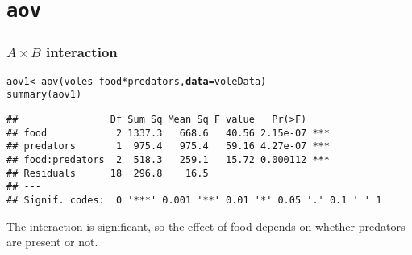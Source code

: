 \documentclass[color=usenames,dvipsnames]{beamer}\usepackage[]{graphicx}\usepackage[]{color}
\makeatletter
\newcommand{\hlopt}[1]{\textcolor[rgb]{0,0,0}{#1}}%
\newcommand{\hlstd}[1]{\textcolor[rgb]{0,0,0}{#1}}%
\newcommand{\hlkwb}[1]{\textcolor[rgb]{0,0.341,0.682}{#1}}%
\newcommand{\hlkwc}[1]{\textcolor[rgb]{0,0,0}{\textbf{#1}}}%
\newcommand{\hlkwd}[1]{\textcolor[rgb]{0.004,0.004,0.506}{#1}}%
\newenvironment{kframe}{%
 \def\at@end@of@kframe{}%
 \ifinner\ifhmode%
  \def\at@end@of@kframe{\end{minipage}}%
  \begin{minipage}{\columnwidth}%
 \fi\fi%
 \def\FrameCommand##1{\hskip\@totalleftmargin \hskip-\fboxsep
 \colorbox{shadecolor}{##1}\hskip-\fboxsep
     \hskip-\linewidth \hskip-\@totalleftmargin \hskip\columnwidth}%
 \MakeFramed {\advance\hsize-\width
   \@totalleftmargin\z@ \linewidth\hsize
   \@setminipage}}%
 {\par\unskip\endMakeFramed%
 \at@end@of@kframe}
\newenvironment{knitrout}{}{} %
\makeatother
\begin{document}
\section{\tt aov}




\begin{frame}[fragile]
  \frametitle{$A \times B$ interaction}
\begin{knitrout}\footnotesize
{}\color{fgcolor}\begin{kframe}
\begin{alltt}
\hlstd{aov1} \hlkwb{<-} \hlkwd{aov}\hlstd{(voles} \hlopt{~} \hlstd{food} \hlopt{*} \hlstd{predators,} \hlkwc{data}\hlstd{=voleData)}
\hlkwd{summary}\hlstd{(aov1)}
\end{alltt}
\begin{verbatim}
##                Df Sum Sq Mean Sq F value   Pr(>F)    
## food            2 1337.3   668.6   40.56 2.15e-07 ***
## predators       1  975.4   975.4   59.16 4.27e-07 ***
## food:predators  2  518.3   259.1   15.72 0.000112 ***
## Residuals      18  296.8    16.5                     
## ---
## Signif. codes:  0 '***' 0.001 '**' 0.01 '*' 0.05 '.' 0.1 ' ' 1
\end{verbatim}
\end{kframe}
\end{knitrout}
\pause
\vfill
The interaction is significant, so the effect of food depends on
whether predators are present or not. %
\end{frame}




\end{document}
